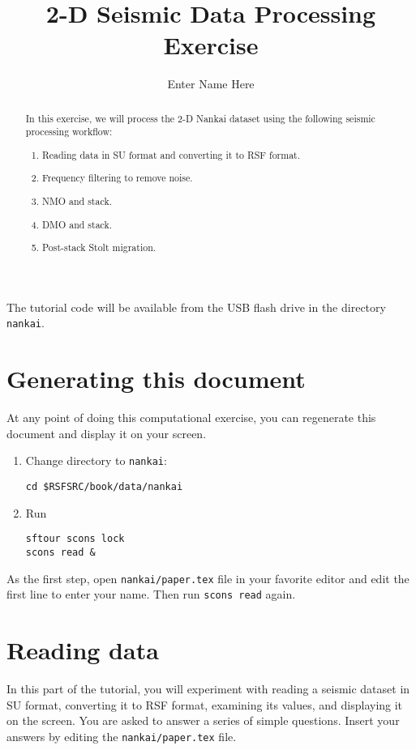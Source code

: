 
\author{Enter Name Here}
\title{2-D Seismic Data Processing Exercise}

\begin{abstract}
  In this exercise, we will process the 2-D Nankai dataset using the following seismic processing workflow:
  \begin{enumerate}
  \item Reading data in SU format and converting it to RSF format. 
  \item Frequency filtering to remove noise.
  \item NMO and stack.
  \item DMO and stack.
  \item Post-stack Stolt migration.
  \end{enumerate}
\end{abstract}

The tutorial code will be available from the USB flash drive in
the directory \texttt{nankai}.

\section{Generating this document}

At any point of doing this computational exercise, you can
regenerate this document and display it on your screen.

\begin{enumerate}          
\item Change directory to \texttt{nankai}:
\begin{verbatim}
cd $RSFSRC/book/data/nankai
\end{verbatim}
\item Run
\begin{verbatim}
sftour scons lock
scons read &
\end{verbatim}
\end{enumerate}

As the first step, open \texttt{nankai/paper.tex} file in your favorite
editor and edit the first line to enter your name. Then
run \texttt{scons read} again.

\section{Reading data}

In this part of the tutorial, you will experiment with reading a
seismic dataset in SU format, converting it to RSF format, examining
its values, and displaying it on the screen. You are asked to answer a
series of simple questions. Insert your answers by editing
the \texttt{nankai/paper.tex} file.

